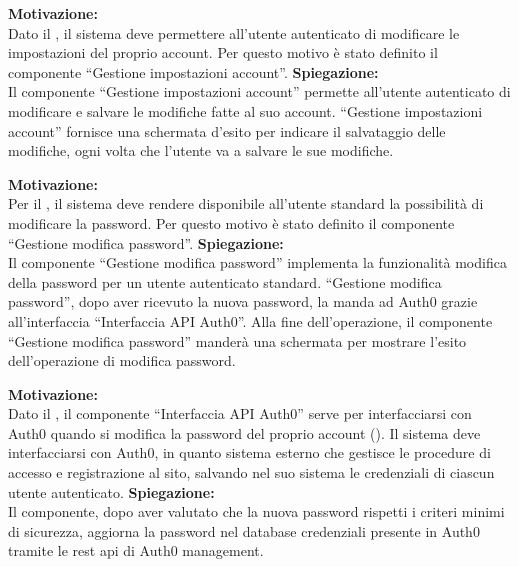 \begin{listaPersonale}[ACI]{}

    \textbf{Motivazione:}\\
    Dato il , il sistema deve permettere all'utente autenticato di modificare le impostazioni del proprio account. Per questo motivo è stato definito il componente “Gestione impostazioni account”.
    \textbf{Spiegazione:}\\
    Il componente “Gestione impostazioni account” permette all'utente autenticato di modificare e salvare le modifiche fatte al suo account.
    “Gestione impostazioni account” fornisce una schermata d'esito per indicare il salvataggio delle modifiche, ogni volta che l'utente va a salvare le sue modifiche.



    \textbf{Motivazione:}\\
    Per il , il sistema deve rendere disponibile all'utente standard la possibilità di modificare la password. Per questo motivo è stato definito il componente “Gestione modifica password”.
    \textbf{Spiegazione:}\\
    Il componente “Gestione modifica password” implementa la funzionalità modifica della password per un utente autenticato standard. “Gestione modifica password”, dopo aver ricevuto la nuova password, la manda ad Auth0 grazie all'interfaccia “Interfaccia API Auth0”. Alla fine dell'operazione, il componente “Gestione modifica password” manderà una schermata per mostrare l'esito dell'operazione di modifica password.



    \textbf{Motivazione:}\\
    Dato il , il componente “Interfaccia API Auth0” serve per interfacciarsi con Auth0 quando si modifica la password del proprio account (). Il sistema deve interfacciarsi con Auth0, in quanto sistema esterno che gestisce le procedure di accesso e registrazione al sito, salvando nel suo sistema le credenziali di ciascun utente autenticato.
    \textbf{Spiegazione:}\\
    Il componente, dopo aver valutato che la nuova password rispetti i criteri minimi di sicurezza, aggiorna la password nel database credenziali presente in Auth0 tramite le rest api di Auth0 management.



\end{listaPersonale}
